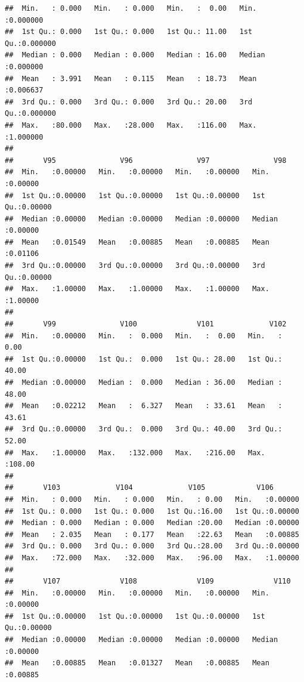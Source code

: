 \documentclass[
]{article}
\begin{document}
\begin{verbatim}
##  Min.   : 0.000   Min.   : 0.000   Min.   :  0.00   Min.   :0.000000  
##  1st Qu.: 0.000   1st Qu.: 0.000   1st Qu.: 11.00   1st Qu.:0.000000  
##  Median : 0.000   Median : 0.000   Median : 16.00   Median :0.000000  
##  Mean   : 3.991   Mean   : 0.115   Mean   : 18.73   Mean   :0.006637  
##  3rd Qu.: 0.000   3rd Qu.: 0.000   3rd Qu.: 20.00   3rd Qu.:0.000000  
##  Max.   :80.000   Max.   :28.000   Max.   :116.00   Max.   :1.000000  
##                                                                       
##       V95               V96               V97               V98         
##  Min.   :0.00000   Min.   :0.00000   Min.   :0.00000   Min.   :0.00000  
##  1st Qu.:0.00000   1st Qu.:0.00000   1st Qu.:0.00000   1st Qu.:0.00000  
##  Median :0.00000   Median :0.00000   Median :0.00000   Median :0.00000  
##  Mean   :0.01549   Mean   :0.00885   Mean   :0.00885   Mean   :0.01106  
##  3rd Qu.:0.00000   3rd Qu.:0.00000   3rd Qu.:0.00000   3rd Qu.:0.00000  
##  Max.   :1.00000   Max.   :1.00000   Max.   :1.00000   Max.   :1.00000  
##                                                                         
##       V99               V100              V101             V102       
##  Min.   :0.00000   Min.   :  0.000   Min.   :  0.00   Min.   :  0.00  
##  1st Qu.:0.00000   1st Qu.:  0.000   1st Qu.: 28.00   1st Qu.: 40.00  
##  Median :0.00000   Median :  0.000   Median : 36.00   Median : 48.00  
##  Mean   :0.02212   Mean   :  6.327   Mean   : 33.61   Mean   : 43.61  
##  3rd Qu.:0.00000   3rd Qu.:  0.000   3rd Qu.: 40.00   3rd Qu.: 52.00  
##  Max.   :1.00000   Max.   :132.000   Max.   :216.00   Max.   :108.00  
##                                                                       
##       V103             V104             V105            V106        
##  Min.   : 0.000   Min.   : 0.000   Min.   : 0.00   Min.   :0.00000  
##  1st Qu.: 0.000   1st Qu.: 0.000   1st Qu.:16.00   1st Qu.:0.00000  
##  Median : 0.000   Median : 0.000   Median :20.00   Median :0.00000  
##  Mean   : 2.035   Mean   : 0.177   Mean   :22.63   Mean   :0.00885  
##  3rd Qu.: 0.000   3rd Qu.: 0.000   3rd Qu.:28.00   3rd Qu.:0.00000  
##  Max.   :72.000   Max.   :32.000   Max.   :96.00   Max.   :1.00000  
##                                                                     
##       V107              V108              V109              V110        
##  Min.   :0.00000   Min.   :0.00000   Min.   :0.00000   Min.   :0.00000  
##  1st Qu.:0.00000   1st Qu.:0.00000   1st Qu.:0.00000   1st Qu.:0.00000  
##  Median :0.00000   Median :0.00000   Median :0.00000   Median :0.00000  
##  Mean   :0.00885   Mean   :0.01327   Mean   :0.00885   Mean   :0.00885  

\end{verbatim}
\end{document}

